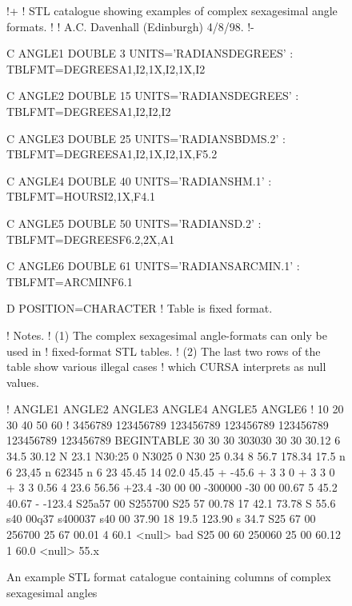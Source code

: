 \documentclass[twoside,11pt]{starlink}
\begin{document}
\begin{figure}[htbp]


\begin{terminalv}
!+
! STL catalogue showing examples of complex sexagesimal angle formats.
!
! A.C. Davenhall (Edinburgh) 4/8/98.
!-

C ANGLE1  DOUBLE   3  UNITS='RADIANS{DEGREES}'
:  TBLFMT=DEGREES{A1,I2,1X,I2,1X,I2}

C ANGLE2  DOUBLE  15  UNITS='RADIANS{DEGREES}'
:  TBLFMT=DEGREES{A1,I2,I2,I2}

C ANGLE3  DOUBLE  25  UNITS='RADIANS{BDMS.2}'
:  TBLFMT=DEGREES{A1,I2,1X,I2,1X,F5.2}

C ANGLE4  DOUBLE  40  UNITS='RADIANS{HM.1}'
:  TBLFMT=HOURS{I2,1X,F4.1}

C ANGLE5  DOUBLE  50  UNITS='RADIANS{D.2}'
:  TBLFMT=DEGREES{F6.2,2X,A1}

C ANGLE6  DOUBLE  61  UNITS='RADIANS{ARCMIN.1}'
:  TBLFMT=ARCMIN{F6.1}

D POSITION=CHARACTER  ! Table is fixed format.

! Notes.
! (1) The complex sexagesimal angle-formats can only be used in
!     fixed-format STL tables.
! (2) The last two rows of the table show various illegal cases
!     which CURSA interprets as null values.

!    ANGLE1    ANGLE2         ANGLE3    ANGLE4      ANGLE5  ANGLE6
!        10        20        30        40        50        60
! 3456789 123456789 123456789 123456789 123456789 123456789 123456789
BEGINTABLE
   30 30 30    303030    30 30 30.12    6 34.5    30.12  N    23.1
  N30:25  0   N3025 0   N30 25  0.34    8 56.7   178.34       17.5
  n 6 23,45   n 62345   n 6 23 45.45   14 02.0    45.45  +   -45.6
  + 3  3  0   + 3 3 0   + 3  3  0.56    4 23.6    56.56      +23.4
  -30 00 00   -300000   -30 00 00.67    5 45.2    40.67  -  -123.4
  S25a57 00   S255700   S25 57 00.78   17 42.1    73.78  S    55.6
  s40 00q37   s400037   s40 00 37.90   18 19.5   123.90  s    34.7
  S25 67 00    256700    25 67 00.01    4 60.1   <null>        bad
  S25 00 60    250060    25 00 60.12    1 60.0   <null>       55.x
\end{terminalv}

\begin{quote}
\caption[Example STL format catalogue with complex sexagesimal angles]
{An example STL format catalogue containing columns of complex sexagesimal
angles\label{STLCOMPANG} }
\end{quote}

\end{figure}
\end{document}
